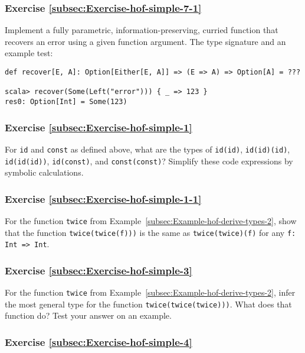 \subsubsection{Exercise \label{subsec:Exercise-hof-simple-7-1}\ref{subsec:Exercise-hof-simple-7-1}}

Implement a fully parametric, information-preserving, curried function
that recovers an error using a given function argument. The type signature
and an example test:
\begin{lstlisting}
def recover[E, A]: Option[Either[E, A]] => (E => A) => Option[A] = ???

scala> recover(Some(Left("error"))) { _ => 123 }
res0: Option[Int] = Some(123)
\end{lstlisting}


\subsubsection{Exercise \label{subsec:Exercise-hof-simple-1}\ref{subsec:Exercise-hof-simple-1}}

For \lstinline!id! and \lstinline!const! as defined above, what
are the types of \lstinline!id(id)!, \lstinline!id(id)(id)!, \lstinline!id(id(id))!,
\lstinline!id(const)!, and \lstinline!const(const)!? Simplify these
code expressions by symbolic calculations.

\subsubsection{Exercise \label{subsec:Exercise-hof-simple-1-1}\ref{subsec:Exercise-hof-simple-1-1}}

For the function \lstinline!twice! from Example~\ref{subsec:Example-hof-derive-types-2},
show that the function \lstinline!twice(twice(f)))! is the same as
\lstinline!twice(twice)(f)! for any \lstinline!f: Int => Int!. 

\subsubsection{Exercise \label{subsec:Exercise-hof-simple-3}\ref{subsec:Exercise-hof-simple-3}}

For the function \lstinline!twice! from Example~\ref{subsec:Example-hof-derive-types-2},
infer the most general type for the function \lstinline!twice(twice(twice)))!.
What does that function do? Test your answer on an example.

\subsubsection{Exercise \label{subsec:Exercise-hof-simple-4}\ref{subsec:Exercise-hof-simple-4}}

